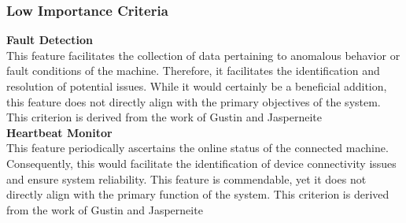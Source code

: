 \subsubsection{Low Importance Criteria}
\textbf{Fault Detection}\\
This feature facilitates the collection of data pertaining to anomalous behavior or fault conditions of the machine. Therefore, it facilitates the identification and resolution of potential issues. While it would certainly be a beneficial addition, this feature does not directly align with the primary objectives of the system.
This criterion is derived from the work of Gustin and Jasperneite\\
\textbf{Heartbeat Monitor}\\
This feature periodically ascertains the online status of the connected machine. Consequently, this would facilitate the identification of device connectivity issues and ensure system reliability.
This feature is commendable, yet it does not directly align with the primary function of the system.
This criterion is derived from the work of Gustin and Jasperneite\\\\


